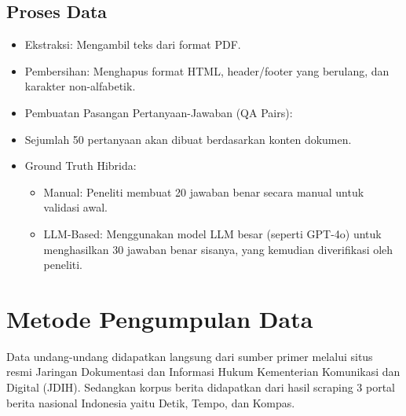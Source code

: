 \subsection{Proses Data}
\begin{itemize}
    \item Ekstraksi: Mengambil teks dari format PDF.
    \item Pembersihan: Menghapus format HTML, header/footer yang berulang, dan karakter non-alfabetik.
    \item Pembuatan Pasangan Pertanyaan-Jawaban (QA Pairs):
    \item Sejumlah 50 pertanyaan akan dibuat berdasarkan konten dokumen.
    \item Ground Truth Hibrida:
        \begin{itemize}
            \item Manual: Peneliti membuat 20 jawaban benar secara manual untuk validasi awal.
            \item LLM-Based: Menggunakan model LLM besar (seperti GPT-4o) untuk menghasilkan 30 jawaban benar sisanya, yang kemudian diverifikasi oleh peneliti.
        \end{itemize}
\end{itemize}


\section{Metode Pengumpulan Data}
Data undang-undang didapatkan langsung dari sumber primer melalui situs resmi Jaringan Dokumentasi dan Informasi Hukum Kementerian Komunikasi dan Digital (JDIH). Sedangkan korpus berita didapatkan dari hasil scraping 3 portal berita nasional Indonesia yaitu Detik, Tempo, dan Kompas.

